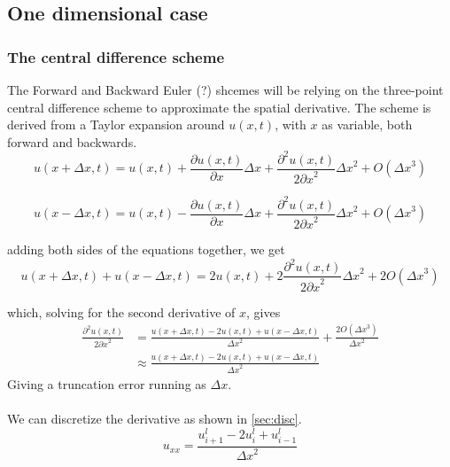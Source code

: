 \documentclass[10pt,a4paper]{article}
\newcommand{\dx}{{\Delta x}}
\newcommand{\px}{{\partial x}}
\newcommand{\pu}{{\partial u}}
\newcommand{\ppu}{{\partial^2 u}}
\begin{document}
\subsection{One dimensional case}
\subsubsection{The central difference scheme}\label{sec:cent}
The Forward and Backward Euler (?) shcemes will be relying on the three-point central difference scheme to approximate the spatial derivative. The scheme is derived from a Taylor expansion around $u(x,t)$, with $x$ as variable, both forward and backwards.
\begin{equation}
u(x+\Delta x, t) = u(x,t) + \frac{\pu(x,t)}{\px}\dx + \frac{\ppu(x,t)}{2\px^2}\dx^2 + O(\dx^3)
\end{equation}

\begin{equation}
u(x-\Delta x, t) = u(x,t) - \frac{\pu(x,t)}{\px}\dx + \frac{\ppu(x,t)}{2\px^2}\dx^2 + O(\dx^3)
\end{equation}

adding both sides of the equations together, we get
\begin{equation}
u(x+\Delta x, t) + u(x-\Delta x, t) = 2u(x,t) + 2\frac{\ppu(x,t)}{2\px^2}\dx^2 + 2O(\dx^3)
\end{equation}

which, solving for the second derivative of $x$, gives
\begin{equation}\begin{split}
\frac{\ppu(x,t)}{2\px^2} &= \frac{u(x+\Delta x, t) - 2u(x,t) + u(x-\Delta x, t)}{\dx^2} + \frac{2O(\dx^3)}{\dx^2}\\
&\approx \frac{u(x+\Delta x, t) - 2u(x,t) + u(x-\Delta x, t)}{\dx^2}
\end{split}\end{equation}
Giving a truncation error running as $\dx$.\\\\
We can discretize the derivative as shown in \ref{sec:disc}.
\begin{equation}
u_{xx} = \frac{u_{i+1}^l - 2u_i^l+u_{i-1}^l}{\dx^2}
\end{equation}
\end{document}
